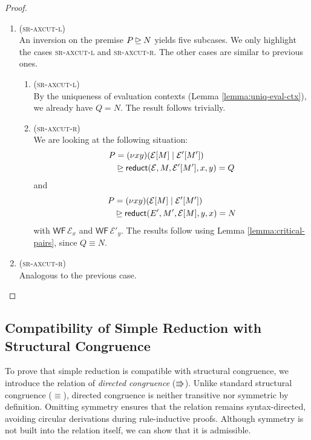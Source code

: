 \begin{proof}
\begin{enumerate}[itemsep=1em, label=Case:, leftmargin=*]
    \item (\textsc{sr-axcut-l}) \\
      An inversion on the premise $P \unrhd N$ yields five subcases. We
      only highlight the cases \textsc{sr-axcut-l} and \textsc{sr-axcut-r}.
      The other cases are similar to previous ones.
      \begin{enumerate}[itemsep=1em, label=Subcase:]
        \item (\textsc{sr-axcut-l}) \\
          By the uniqueness of evaluation contexts (Lemma \ref{lemma:uniq-eval-ctx}),
          we already have $Q = N$. The result follows trivially.

        \item (\textsc{sr-axcut-r}) \\
          We are looking at the following situation:
          \begin{align*}
            P &= (\nu x y)(\mathcal{E}[M] \mid \mathcal{E'}[M']) \\ & \unrhd
              \mathsf{reduct}(\mathcal{E}, M, \mathcal{E'}[M'], x, y) = Q
          \end{align*}
          and
          \begin{align*}
            P & = (\nu x y)(\mathcal{E}[M] \mid \mathcal{E'}[M']) \\ & \unrhd
              \mathsf{reduct}(E', M', \mathcal{E}[M], y, x) = N
          \end{align*}
          with $\mathsf{WF} \, \mathcal{E}_x$ and $\mathsf{WF} \, \mathcal{E}'_y$.
          The results follow using Lemma \ref{lemma:critical-pairs}, since $Q \equiv N$.
      \end{enumerate}
    \item (\textsc{sr-axcut-r}) \\
      Analogous to the previous case.
  \end{enumerate}
\end{proof}

\subsection{Compatibility of Simple Reduction with Structural Congruence}
To prove that simple reduction is compatible with structural congruence,
we introduce the relation of \emph{directed congruence} ($\Rrightarrow$).
Unlike standard structural congruence ($\equiv$), directed congruence is neither
transitive nor symmetric by definition.
Omitting symmetry ensures that the relation remains syntax-directed, avoiding
circular derivations during rule-inductive proofs.
Although symmetry is not built into the relation itself, we can show that it is admissible.

